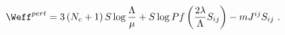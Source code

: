 \begin{equation}
\Weff^{pert}=3\left(N_c+1\right)S\log{\frac{\Lambda}{\mu}}
+S\log{Pf\left(\frac{2\lambda}{\Lambda} S_{ij} \right)} -m J^{ij}S_{ij} ~.
\end{equation}


